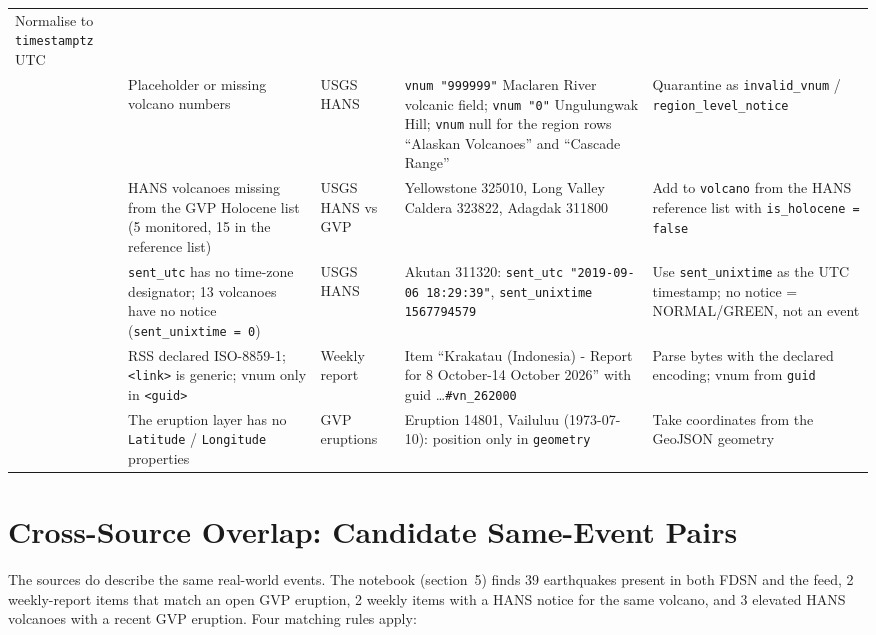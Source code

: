 \documentclass[11pt,a4paper]{article}
\begin{document}
\begin{longtable}{@{}L{0.5cm}L{3.5cm}L{2.0cm}L{4.6cm}L{4.1cm}@{}}
Normalise to \texttt{timestamptz} UTC \\
 & Placeholder or missing volcano numbers & USGS HANS &
\texttt{vnum "999999"} Maclaren River volcanic field; \texttt{vnum "0"} Ungulungwak
Hill; \texttt{vnum} null for the region rows ``Alaskan Volcanoes'' and ``Cascade
Range'' &
Quarantine as \texttt{invalid\_vnum} / \texttt{region\_level\_notice} \\
 & HANS volcanoes missing from the GVP Holocene list (5 monitored, 15 in the
reference list) & USGS HANS vs GVP &
Yellowstone 325010, Long Valley Caldera 323822, Adagdak 311800 &
Add to \texttt{volcano} from the HANS reference list with
\texttt{is\_holocene = false} \\
 & \texttt{sent\_utc} has no time-zone designator; 13 volcanoes have no notice
(\texttt{sent\_unixtime = 0}) & USGS HANS &
Akutan 311320: \texttt{sent\_utc "2019-09-06 18:29:39"},
\texttt{sent\_unixtime 1567794579} &
Use \texttt{sent\_unixtime} as the UTC timestamp; no notice = NORMAL/GREEN, not an
event \\
 & RSS declared ISO-8859-1; \texttt{<link>} is generic; vnum only in
\texttt{<guid>} & Weekly report &
Item ``Krakatau (Indonesia) - Report for 8 October-14 October 2026'' with guid
\dots\texttt{\#vn\_262000} &
Parse bytes with the declared encoding; vnum from \texttt{guid} \\
 & The eruption layer has no \texttt{Latitude} / \texttt{Longitude} properties &
GVP eruptions &
Eruption 14801, Vailuluu (1973-07-10): position only in \texttt{geometry} &
Take coordinates from the GeoJSON geometry \\
\end{longtable}
\endgroup

\section{Cross-Source Overlap: Candidate Same-Event Pairs}
\label{sec:overlap}

The sources do describe the same real-world events. The notebook (section~5) finds 39
earthquakes present in both FDSN and the feed, 2 weekly-report items that match an
open GVP eruption, 2 weekly items with a HANS notice for the same volcano, and 3
elevated HANS volcanoes with a recent GVP eruption. Four matching rules apply:
\end{document}
